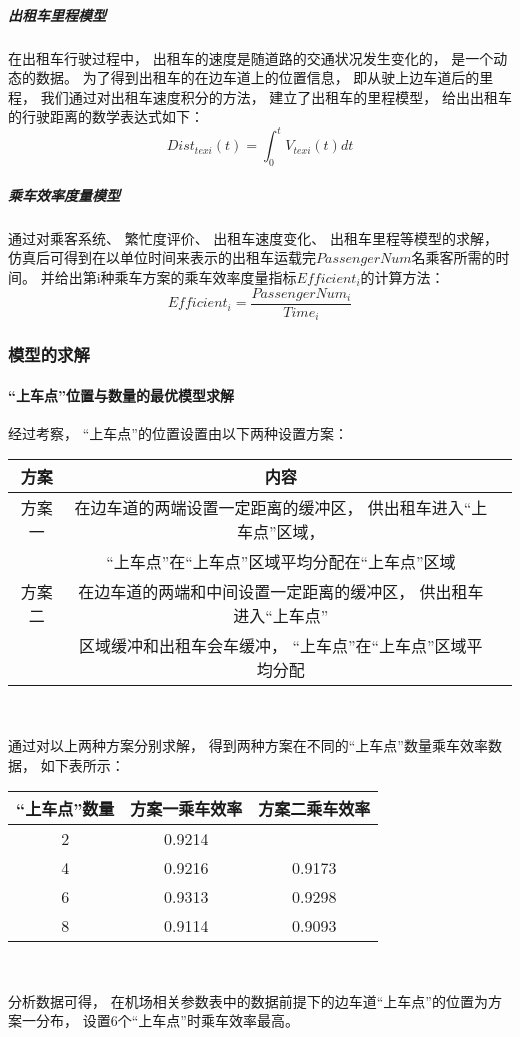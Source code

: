 \documentclass[withoutpreface,bwprint]{cumcmthesis} %
\begin{document}
\subparagraph{出租车里程模型}
在出租车行驶过程中， 出租车的速度是随道路的交通状况发生变化的， 是一个动态的数据。 为了得到出租车的在边车道上的位置信息， 即从驶上边车道后的里程， 我们通过对出租车速度积分的方法， 建立了出租车的里程模型， 给出出租车的行驶距离的数学表达式如下：
\begin{equation}
	Dist_{texi}(t) = \int_{0}^{t}V_{texi}(t)dt
\end{equation}
\subparagraph{乘车效率度量模型}
通过对乘客系统、 繁忙度评价、 出租车速度变化、 出租车里程等模型的求解， 仿真后可得到在以单位时间来表示的出租车运载完\(PassengerNum\)名乘客所需的时间。 并给出第i种乘车方案的乘车效率度量指标\(Efficient_{i}\)的计算方法：
\begin{equation}
	Efficient_{i} = \frac{PassengerNum_{i}}{Time_{i}}
\end{equation}

\subsubsection{模型的求解}
\paragraph{“上车点”位置与数量的最优模型求解}
经过考察， “上车点”的位置设置由以下两种设置方案：
\begin{center}
	\begin{tabular}{ccc}
		\hline
		方案&内容\\
		\hline
		方案一&在边车道的两端设置一定距离的缓冲区， 供出租车进入“上车点”区域，\\
		& “上车点”在“上车点”区域平均分配在“上车点”区域\\
		方案二&在边车道的两端和中间设置一定距离的缓冲区， 供出租车进入“上车点”\\
		&区域缓冲和出租车会车缓冲， “上车点”在“上车点”区域平均分配\\
		\hline
	\end{tabular}\\
\end{center}
通过对以上两种方案分别求解， 得到两种方案在不同的“上车点”数量乘车效率数据， 如下表所示：
\begin{center}
	\begin{tabular}{ccc}
		\hline
		“上车点”数量&方案一乘车效率&方案二乘车效率\\
		\hline
		2&0.9214&\\
		4&0.9216&0.9173\\
		6&0.9313&0.9298\\
		8&0.9114&0.9093\\
		\hline
	\end{tabular}\\
\end{center}
分析数据可得， 在机场相关参数表中的数据前提下的边车道“上车点”的位置为方案一分布， 设置6个“上车点”时乘车效率最高。
\end{document}
